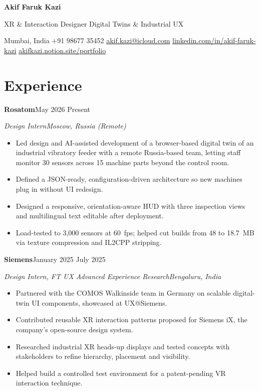 \documentclass[a4paper,10pt]{article}
\newlength{\entrygap}\setlength{\entrygap}{9pt}  %
\newcommand{\entry}[4]{%
    {\color{ink}\textbf{#1}}\hfill{\color{muted}#2}\par
    \textit{#3}\hfill{\color{muted}\textit{#4}}\par
}
\newcommand{\sep}{\unskip\enspace\textbar\enspace\ignorespaces}
\begin{document}
{\color{ink}\fontsize{22}{26}\selectfont\bfseries Akif Faruk Kazi}\par
\vspace{3pt}
{\color{ink}\large XR \& Interaction Designer \sep Digital Twins \& Industrial UX}\par
\vspace{6pt}
{\small Mumbai, India
\sep +91 98677 35452
\sep \href{mailto:akif.kazi@icloud.com}{akif.kazi@icloud.com}
\sep \href{https://www.linkedin.com/in/akif-faruk-kazi/}{linkedin.com/in/akif-faruk-kazi}
\sep \href{https://akifkazi.notion.site/portfolio}{akifkazi.notion.site/portfolio}}\par

\section{Experience}

\entry{Rosatom}{May 2026 \textendash{} Present}{Design Intern}{Moscow, Russia (Remote)}
\begin{itemize}
    \item Led design and AI-assisted development of a browser-based digital twin of an industrial vibratory feeder with a remote Russia-based team, letting staff monitor 30 sensors across 15 machine parts beyond the control room.
    \item Defined a JSON-ready, configuration-driven architecture so new machines plug in without UI redesign.
    \item Designed a responsive, orientation-aware HUD with three inspection views and multilingual text editable after deployment.
    \item Load-tested to 3,000 sensors at 60~fps; helped cut builds from 48 to 18.7~MB via texture compression and IL2CPP stripping.
\end{itemize}
\vspace{\entrygap}

\entry{Siemens}{January 2025 \textendash{} July 2025}{Design Intern, FT UX Advanced Experience Research}{Bengaluru, India}
\begin{itemize}
    \item Partnered with the COMOS Walkinside team in Germany on scalable digital-twin UI components, showcased at UX@Siemens.
    \item Contributed reusable XR interaction patterns proposed for Siemens iX, the company's open-source design system.
    \item Researched industrial XR heads-up displays and tested concepts with stakeholders to refine hierarchy, placement and visibility.
    \item Helped build a controlled test environment for a patent-pending VR interaction technique.
\end{itemize}
\vspace{\entrygap}
\end{document}
